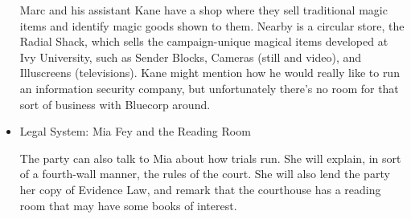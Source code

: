 \begin{itemize}
Marc and his assistant Kane have a shop where they sell traditional magic items and identify magic goods shown to them. Nearby is a circular store, the Radial Shack, which sells the campaign-unique magical items developed at Ivy University, such as Sender Blocks, Cameras (still and video), and Illuscreens (televisions). Kane might mention how he would really like to run an information security company, but unfortunately there's no room for that sort of business with Bluecorp around.

\item Legal System: Mia Fey and the Reading Room

The party can also talk to Mia about how trials run. She will explain, in sort of a fourth-wall manner, the rules of the court. She will also lend the party her copy of Evidence Law, and remark that the courthouse has a reading room that may have some books of interest.
\end{itemize}


